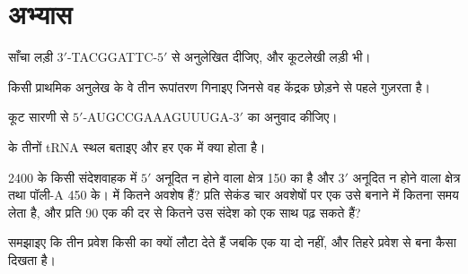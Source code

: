 \section{अभ्यास}

\begin{exercise}[$\star$]\label{exo:b1:gene-expression:1}
साँचा लड़ी $3'$-TACGGATTC-$5'$ से अनुलेखित  दीजिए, और कूटलेखी लड़ी
भी।
\end{exercise}

\begin{exercise}[$\star$]\label{exo:b1:gene-expression:2}
किसी  प्राथमिक अनुलेख के वे तीन रूपांतरण गिनाइए जिनसे वह
केंद्रक छोड़ने से पहले गुज़रता है।
\end{exercise}

\begin{exercise}[$\star$]\label{exo:b1:gene-expression:3}
कूट सारणी से $5'$-AUGCCGAAAGUUUGA-$3'$ का अनुवाद कीजिए।
\end{exercise}

\begin{exercise}[$\star$]\label{exo:b1:gene-expression:4}
 के तीनों tRNA स्थल बताइए और हर एक में क्या होता है।
\end{exercise}

\begin{exercise}[$\star\star$]\label{exo:b1:gene-expression:5}
\qty{2400}{}  के किसी संदेशवाहक में $5'$ अनूदित न होने
वाला क्षेत्र \qty{150}{} का है और $3'$ अनूदित न होने वाला क्षेत्र तथा
पॉली-A \qty{450}{} के।  में कितने अवशेष हैं? प्रति सेकंड चार
अवशेषों पर एक  उसे बनाने में कितना समय लेता है, और प्रति
\qty{90}{}  एक की दर से कितने  उस संदेश को एक साथ
पढ़ सकते हैं?
\end{exercise}

\begin{exercise}[$\star\star$]\label{exo:b1:gene-expression:6}
समझाइए कि तीन प्रवेश किसी  का  क्यों लौटा देते हैं जबकि एक
या दो नहीं, और तिहरे प्रवेश से बना  कैसा दिखता है।
\end{exercise}

